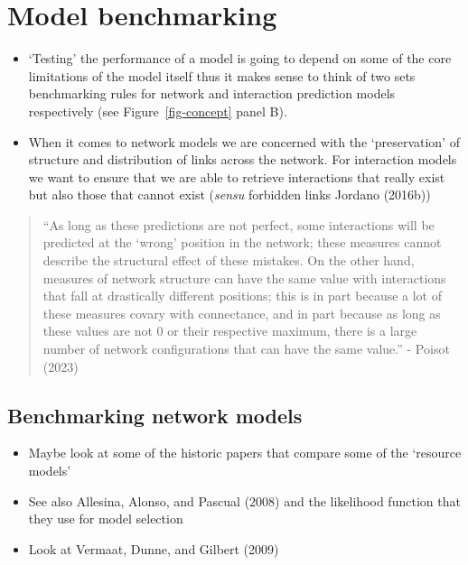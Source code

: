 \documentclass[
  letterpaper,
  DIV=11,
  numbers=noendperiod]{scrartcl}
\begin{document}
\section{Model benchmarking}\label{model-benchmarking}

\begin{itemize}
\item
  `Testing' the performance of a model is going to depend on some of the
  core limitations of the model itself thus it makes sense to think of
  two sets benchmarking rules for network and interaction prediction
  models respectively (see Figure~\ref{fig-concept} panel B).
\item
  When it comes to network models we are concerned with the
  `preservation' of structure and distribution of links across the
  network. For interaction models we want to ensure that we are able to
  retrieve interactions that really exist but also those that cannot
  exist (\emph{sensu} forbidden links Jordano (2016b))
\end{itemize}

\begin{quote}
``As long as these predictions are not perfect, some interactions will
be predicted at the `wrong' position in the network; these measures
cannot describe the structural effect of these mistakes. On the other
hand, measures of network structure can have the same value with
interactions that fall at drastically different positions; this is in
part because a lot of these measures covary with connectance, and in
part because as long as these values are not 0 or their respective
maximum, there is a large number of network configurations that can have
the same value.'' - Poisot (2023)
\end{quote}

\subsection{Benchmarking network
models}\label{benchmarking-network-models}

\begin{itemize}
\item
  Maybe look at some of the historic papers that compare some of the
  `resource models'
\item
  See also Allesina, Alonso, and Pascual (2008) and the likelihood
  function that they use for model selection
\item
  Look at Vermaat, Dunne, and Gilbert (2009)
\end{itemize}
\end{document}
